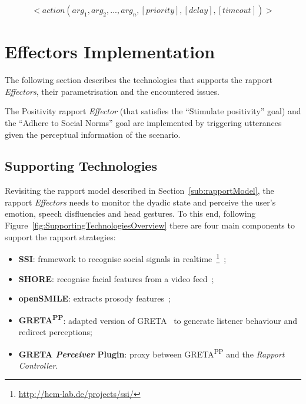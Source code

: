 \begin{equation}
	<action(arg_1, arg_2, ..., arg_n, [priority], [delay], [timeout])>
	\label{eq:behaviour}
\end{equation}


\section{Effectors Implementation}

The following section describes the technologies that supports the rapport \textit{Effectors}, their parametrisation and the encountered issues. 

The Positivity rapport \textit{Effector} (that satisfies the ``Stimulate positivity'' goal) and the ``Adhere to Social Norms'' goal are implemented by triggering utterances given the perceptual information of the scenario. 

\subsection{Supporting Technologies}

Revisiting the rapport model described in Section~\ref{sub:rapportModel}, the rapport \textit{Effectors} needs to monitor the dyadic state and perceive the user's emotion, speech disfluencies and head gestures. To this end, following Figure~\ref{fig:SupportingTechnologiesOverview} there are four main components to support the rapport strategies:
\begin{itemize}
	\item \textbf{\ac{SSI}}: framework to recognise social signals in realtime~\footnote{\url{http://hcm-lab.de/projects/ssi/}}~\cite{Wagner2013};
	\item \textbf{SHORE}: recognise facial features from a video feed~\cite{Ruf2011};
	\item \textbf{openSMILE}: extracts prosody features~\cite{Eyben:2013:RDO:2502081.2502224};
	\item \textbf{GRETA\textsuperscript{PP}}: adapted version of GRETA~\cite{Niewiadomski2009} to generate listener behaviour and redirect perceptions;
	\item \textbf{GRETA \textit{Perceiver} Plugin}: proxy between GRETA\textsuperscript{PP} and the \textit{Rapport Controller}.
\end{itemize}

